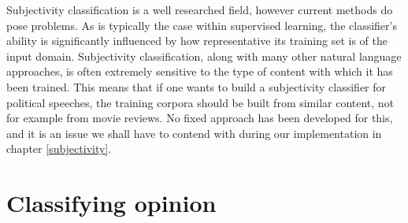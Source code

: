 Subjectivity classification is a well researched field, however current methods do pose problems. As is typically the case within supervised learning, the classifier's ability is significantly influenced by how representative its training set is of the input domain. Subjectivity classification, along with many other natural language approaches, is often extremely sensitive to the type of content with which it has been trained. This means that if one wants to build a subjectivity classifier for political speeches, the training corpora should be built from similar content, not for example from movie reviews. No fixed approach has been developed for this, and it is an issue we shall have to contend with during our implementation in chapter \ref{subjectivity}. 

\begin{comment}
	
Subjectivity word-sense disambiguation \cite{Akkaya:2009ww}

- typical approaches rely on lexicon of words
	- these are usually word lists rather than meanings (or senses)
	- can lead to false hits i.e. word assumed to imply s, when really it is o
- thus Subjectivity Word Sense Disambiguation
	- labels clue words as subjective or objective sense
	- more feasible than full word-sense
- use SVM
- use bootstrapping to create a training set

- since sentences often contain multiple subjective expressions, expression level classification is more informative than sentence-level classification

Word sense and subjectivity \cite{Wiebe:2006te}
- propose that there are motivations for separate classifiers, one each
- top of page 6 makes very good point about a word typically being subjective, being objective in a subjective sentence

Learning subjective adjectives from a corpora \cite{Wiebe:2000ub}

Effects of adjective orientation \cite{Wiebe:2000tk}
- use word conjunctions to find positive/negative adjectives
	- e.g. would say corrupt and brutal, not corrup or brutal

\end{comment}


\section{Classifying opinion}
\label{background:sentiment_classification}

